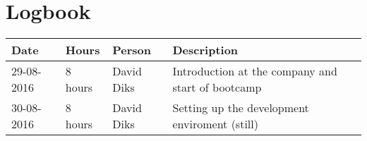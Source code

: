 \chapter{Logbook}
\begin{tabular}{|l|l|l|l|}
	\hline
	\textbf{Date} & \textbf{Hours} & \textbf{Person} & \textbf{Description} \\
	\hline
	29-08-2016 & 8 hours & David Diks & Introduction at the company and start of bootcamp \\ \hline
	30-08-2016 & 8 hours & David Diks & Setting up the development enviroment (still) \\ \hline
\end{tabular}